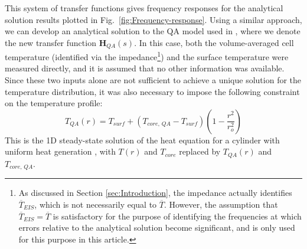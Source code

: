 \documentclass[journal, english]{IEEEtran}
\begin{document}
This system of transfer
functions gives frequency responses for the analytical solution results
plotted in Fig.\ \ref{fig:Frequency-response}. Using a similar approach, we
can develop an analytical solution to the
QA model used in \cite{Richardson2014}, where we denote the new transfer
function $\mathbf{H}_{QA}(s)$. In this case, both the volume-averaged cell
temperature (identified via the impedance\footnote{As discussed in Section \ref{sec:Introduction}, the impedance actually
identifies $\overline{T}_{EIS}$, which is not necessarily equal to
$\overline{T}$. However, the assumption that $\overline{T}_{EIS}=\overline{T}$
is satisfactory for the purpose of identifying the frequencies at
which errors relative to the analytical solution become significant, and is only used for this purpose in this article.}) and the surface temperature
were measured directly, and it is assumed that no other information
was available. Since these two inputs alone are not sufficient to
achieve a unique solution for the temperature distribution, it was
also necessary to impose the following constraint on the temperature
profile:
\begin{equation}
T_{QA}(r)=T_{surf}+(T_{core,\, QA}-T_{surf})\left(1-\frac{r^{2}}{r_{o}^{2}}\right)\label{eq:T_QA_r}
\end{equation}
This is the 1D steady-state solution of the heat equation
for a cylinder with uniform heat generation \cite{Incropera2007a},
with $T(r)$ and $T_{core}$ replaced by $T_{QA}(r)$ and $T_{core,\, QA}$. 
\end{document}
